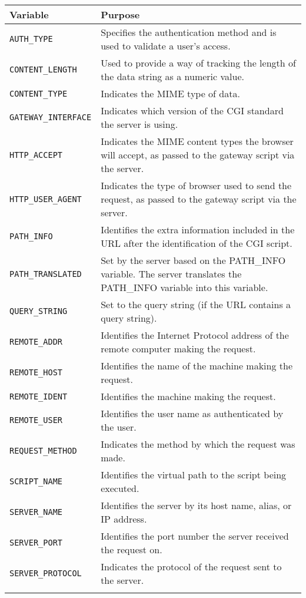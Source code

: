 \begin{center}
\begin{longtable}{|l|p{9cm}|}
\hline
{\bf Variable} & {\bf Purpose}\\
\hline
\verb|AUTH_TYPE| & 
Specifies the authentication method and is used to validate a user's access.
\\\hline
\verb|CONTENT_LENGTH| & Used to provide a way of tracking the length of the 
data string as a numeric value.\\\hline
\verb|CONTENT_TYPE| & Indicates the MIME type of data. \\\hline
\verb|GATEWAY_INTERFACE| & Indicates which version of the CGI standard the 
server is using.\\\hline
\verb|HTTP_ACCEPT|	& Indicates the MIME content types the browser will accept, 
as passed to the gateway script via the server.\\\hline
\verb|HTTP_USER_AGENT| & Indicates the type of browser used to send the request, 
as passed to the gateway script via the server.\\\hline
\verb|PATH_INFO| & Identifies the extra information included in the URL after 
the identification of the CGI script. \\\hline
\verb|PATH_TRANSLATED| & Set by the server based on the PATH\_INFO variable. 
The server translates the PATH\_INFO variable into this variable. \\\hline
\verb|QUERY_STRING| & Set to the query string (if the URL contains a query string).\\\hline 
\verb|REMOTE_ADDR| & Identifies the Internet Protocol address of the remote computer making the request.\\\hline 
\verb|REMOTE_HOST| & Identifies the name of the machine making the request.\\\hline 
\verb|REMOTE_IDENT| & Identifies the machine making the request.\\\hline 
\verb|REMOTE_USER| & Identifies the user name as authenticated by the user.\\\hline 
\verb|REQUEST_METHOD| & Indicates the method by which the request was made. \\\hline 
\verb|SCRIPT_NAME| & Identifies the virtual path to the script being executed.\\\hline 
\verb|SERVER_NAME| & Identifies the server by its host name, alias, or IP address.\\\hline 
\verb|SERVER_PORT| & Identifies the port number the server received the request on.\\\hline
\verb|SERVER_PROTOCOL| & Indicates the protocol of the request sent to the server.\\\hline
\\\hline
\end{longtable}
\end{center}
